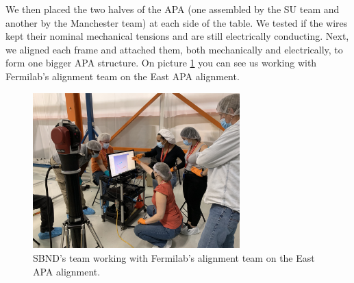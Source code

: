  We then placed the two halves of the APA (one assembled by the SU team and another by the Manchester team) at each side of the table. We tested if the wires kept their nominal mechanical tensions and are still electrically conducting. Next, we aligned each frame and attached them, both mechanically and electrically, to form one bigger APA structure. On picture \ref{fig:aligment} you can see us working with Fermilab's alignment team on the East APA alignment. 

 \begin{figure}[h!]
    \centering
    \includegraphics[width=80mm]{Figures/IMG_3794.jpeg}
    \caption{SBND's team working with Fermilab's alignment team on the East APA alignment.}
    \label{fig:aligment}
\end{figure}


